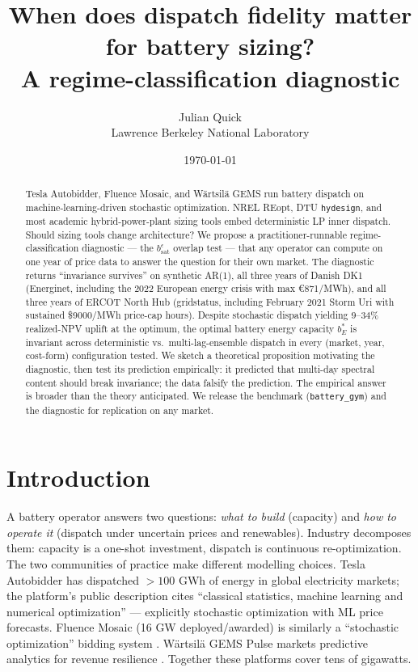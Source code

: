 \documentclass[11pt]{article}
\title{When does dispatch fidelity matter for battery sizing?\\
A regime-classification diagnostic}
\author{Julian Quick \\ \small{Lawrence Berkeley National Laboratory}}
\date{\today}
\begin{document}
\maketitle

\begin{abstract}
Tesla Autobidder, Fluence Mosaic, and W\"{a}rtsil\"{a} GEMS run battery dispatch on machine-learning-driven stochastic optimization. NREL REopt, DTU \texttt{hydesign}, and most academic hybrid-power-plant sizing tools embed deterministic LP inner dispatch. Should sizing tools change architecture? We propose a practitioner-runnable regime-classification diagnostic --- the $b_{\mathrm{sat}}^{\epsilon}$ overlap test --- that any operator can compute on one year of price data to answer the question for their own market. The diagnostic returns ``invariance survives'' on synthetic AR(1), all three years of Danish DK1 (Energinet, including the 2022 European energy crisis with max \euro 871/MWh), and all three years of ERCOT North Hub (gridstatus, including February 2021 Storm Uri with sustained \$9000/MWh price-cap hours). Despite stochastic dispatch yielding $9$--$34\%$ realized-NPV uplift at the optimum, the optimal battery energy capacity $b_E^*$ is invariant across deterministic vs.\ multi-lag-ensemble dispatch in every (market, year, cost-form) configuration tested. We sketch a theoretical proposition motivating the diagnostic, then test its prediction empirically: it predicted that multi-day spectral content should break invariance; the data falsify the prediction. The empirical answer is broader than the theory anticipated. We release the benchmark (\texttt{battery\_gym}) and the diagnostic for replication on any market.
\end{abstract}

\section{Introduction}

A battery operator answers two questions: \emph{what to build} (capacity) and \emph{how to operate it} (dispatch under uncertain prices and renewables). Industry decomposes them: capacity is a one-shot investment, dispatch is continuous re-optimization. The two communities of practice make different modelling choices. Tesla Autobidder has dispatched $>100$ GWh of energy in global electricity markets; the platform's public description \citep{tesla2024autobidder} cites ``classical statistics, machine learning and numerical optimization'' --- explicitly stochastic optimization with ML price forecasts. Fluence Mosaic (16 GW deployed/awarded) is similarly a ``stochastic optimization'' bidding system \citep{fluence2024mosaic}. W\"{a}rtsil\"{a} GEMS Pulse markets predictive analytics for revenue resilience \citep{wartsila2025gems}. Together these platforms cover tens of gigawatts.
\end{document}
